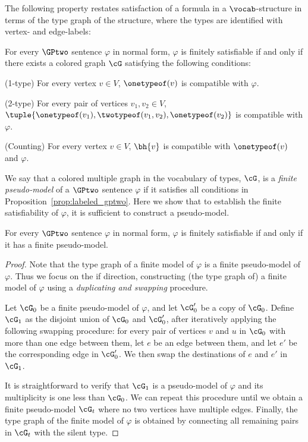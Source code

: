 The following property restates satisfaction of a formula in a $\vocab$-structure in terms of the type graph of the structure, where the types are identified with vertex- and edge-labels:
\begin{proposition}\label{prop:labeled_gptwo}
    For every $\GPtwo$ sentence $\varphi$ in normal form,
    $\varphi$ is finitely satisfiable if and only if
    there exists a colored graph $\cG$ satisfying the following conditions:
    \begin{compactitem}
        \item (1-type) For every vertex $v \in V$, $\onetypeof(v)$ is compatible with $\varphi$.
        \item (2-type) For every pair of vertices $v_1, v_2 \in V$,
        $\tuple{\onetypeof(v_1), \twotypeof(v_1, v_2), \onetypeof(v_2)}$ is compatible with $\varphi$.
        \item (Counting) For every vertex $v \in V$, $\bh{v}$ is compatible with $\onetypeof(v)$ and $\varphi$.
    \end{compactitem}
\end{proposition}

We say that a colored multiple graph in the vocabulary of types, $\cG$, is a \emph{finite pseudo-model} of a $\GPtwo$ sentence $\varphi$ if it satisfies all conditions in Proposition~\ref{prop:labeled_gptwo}.
Here we show that to establish the finite satisfiability of $\varphi$, it is sufficient to construct a pseudo-model.

\begin{lemma}\label{lem:pseudo}
    For every $\GPtwo$ sentence $\varphi$ in normal form,
    $\varphi$ is finitely satisfiable if and only if it has a finite pseudo-model.
\end{lemma}

\begin{proof}
    Note that the type graph of a finite model of $\varphi$ is a finite pseudo-model of $\varphi$. 
    Thus we focus on the if direction,  constructing (the type graph of) a finite model of $\varphi$ using a \emph{duplicating and swapping} procedure.
   
    Let $\cG_0$ be a finite pseudo-model of $\varphi$, and let $\cG'_0$ be a copy of $\cG_0$.
    Define $\cG_1$ as the disjoint union of $\cG_0$ and $\cG'_0$,
    after iteratively applying the following swapping procedure:
    for every pair of vertices $v$ and $u$ in $\cG_0$ with more than one edge between them,
    let $e$ be an edge between them, and let $e'$ be the corresponding edge in $\cG'_0$.
    We then swap the destinations of $e$ and $e'$ in $\cG_1$.

    It is straightforward to verify that $\cG_1$ is a pseudo-model of $\varphi$ and its multiplicity is one less than $\cG_0$.
    We can repeat this procedure until we obtain a finite pseudo-model $\cG_t$ where no two vertices have multiple edges.
    Finally, the type graph of the finite model  of $\varphi$ is obtained by connecting all remaining pairs in $\cG_t$ with the silent type.
\end{proof}

